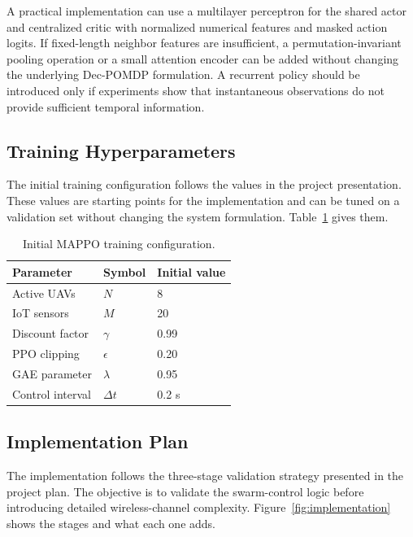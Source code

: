 \documentclass[conference]{IEEEtran}
\begin{document}
A practical implementation can use a multilayer perceptron for the shared actor and centralized critic with normalized numerical features and masked action logits. If fixed-length neighbor features are insufficient, a permutation-invariant pooling operation or a small attention encoder can be added without changing the underlying Dec-POMDP formulation. A recurrent policy should be introduced only if experiments show that instantaneous observations do not provide sufficient temporal information.


\subsection{Training Hyperparameters}
The initial training configuration follows the values in the project presentation. These values are starting points for the implementation and can be tuned on a validation set without changing the system formulation. Table~\ref{tab:hyper} gives them.

\begin{table}[t]
\caption{Initial MAPPO training configuration.}
\label{tab:hyper}
\centering
\scriptsize
\renewcommand{\arraystretch}{1.05}
\begin{tabular}{@{}lll@{}}
\toprule
Parameter & Symbol & Initial value \\
\midrule
Active UAVs & $N$ & 8 \\
IoT sensors & $M$ & 20 \\
Discount factor & $\gamma$ & 0.99 \\
PPO clipping & $\epsilon$ & 0.20 \\
GAE parameter & $\lambda$ & 0.95 \\
Control interval & $\Delta t$ & 0.2 s \\
\bottomrule
\end{tabular}
\end{table}

\subsection{Implementation Plan}
The implementation follows the three-stage validation strategy presented in the project plan. The objective is to validate the swarm-control logic before introducing detailed wireless-channel complexity. Figure~\ref{fig:implementation} shows the stages and what each one adds.
\end{document}
